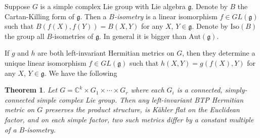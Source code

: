 \documentclass{amsart}
\numberwithin{equation}{section}
\newtheorem{theorem} {Theorem} [section]
\theoremstyle{definition}
\renewcommand{\1}{\mathds{1}}
\renewcommand{\>}{\rightarrow}
\begin{document}
Suppose $G$ is a simple complex Lie group with Lie algebra ${\mathfrak g}$. Denote by $B$ the Cartan-Killing form of ${\mathfrak g}$. Then a {\em $B$-isometry} is a linear isomorphism $f\in GL({\mathfrak g})$ such that $B(f(X),f(Y))=B(X,Y)$ for any $X$, $Y\in {\mathfrak g}$. Denote by $\mbox{Iso}(B)$ the group all $B$-isometries of ${\mathfrak g}$. In general it is bigger than $\mbox{Aut}({\mathfrak g})$.

If $g$ and $h$ are both left-invariant Hermitian metrics on $G$, then they determine a unique linear isomorphism $f\in GL({\mathfrak g})$ such that $h(X, Y) = g(f(X), Y)$ for any $X$, $Y\in {\mathfrak g}$. We have the following

\begin{theorem} \label{thm2.6}
Let $G={\mathbb C}^k \times G_1\times \cdots \times G_r$ where each $G_i$ is a connected, simply-connected simple complex Lie group. Then any left-invariant {\rm BTP} Hermitian metric on $G$ preserves the product structure, is K\"ahler flat on the Euclidean factor, and on each simple factor, two such metrics differ by a constant multiple of a $B$-isometry.
\end{theorem}
\end{document}
